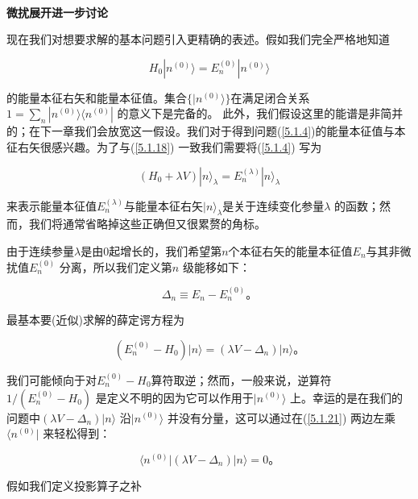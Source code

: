 ﻿\documentclass[UTF8,twoside]{ctexart}
\begin{document}
\

\noindent \textbf{微扰展开进一步讨论}

现在我们对想要求解的基本问题引入更精确的表述。假如我们完全严格地知道

\begin{equation} \label{5.1.18}
H_0|n^{(0)}\rangle = E_n^{(0)}|n^{(0)}\rangle
\end{equation}

\noindent 的能量本征右矢和能量本征值。集合$\{|n^{(0)}\rangle\}$在满足闭合关系$1=\sum_n|n^{(0)}\rangle\langle n^{(0)}|$ 的意义下是完备的。 此外，我们假设这里的能谱是非简并的；在下一章我们会放宽这一假设。我们对于得到问题(\ref{5.1.4})的能量本征值与本征右矢很感兴趣。为了与(\ref{5.1.18}) 一致我们需要将(\ref{5.1.4}) 写为

\begin{equation} \label{5.1.19}
(H_0 + \lambda V)|n\rangle_\lambda = E_n^{(\lambda)}|n\rangle_\lambda
\end{equation}

\noindent 来表示能量本征值$E_n^{(\lambda)}$与能量本征右矢$|n\rangle_\lambda$是关于连续变化参量$\lambda$ 的函数；然而，我们将通常省略掉这些正确但又很累赘的角标。

由于连续参量$\lambda$是由0起增长的，我们希望第$n$个本征右矢的能量本征值$E_n$与其非微扰值$E_n^{(0)}$ 分离，所以我们定义第$n$ 级能移如下：

\begin{equation} \label{5.1.20}
\Delta_n\equiv E_n - E_n^{(0)}\text{。}
\end{equation}

\noindent 最基本要(近似)求解的薛定谔方程为

\begin{equation} \label{5.1.21}
(E_n^{(0)} - H_0)|n\rangle = (\lambda V - \Delta_n)|n\rangle\text{。}
\end{equation}

\noindent 我们可能倾向于对$E_n^{(0)} - H_0$算符取逆；然而，一般来说，逆算符$1/(E_n^{(0)} - H_0)$ 是定义不明的因为它可以作用于$|n^{(0)}\rangle$ 上。幸运的是在我们的问题中$(\lambda V - \Delta_n)|n\rangle$ 沿$|n^{(0)}\rangle$ 并没有分量，这可以通过在(\ref{5.1.21}) 两边左乘$\langle n^{(0)}|$ 来轻松得到：

\begin{equation} \label{5.1.22}
\langle n^{(0)}|(\lambda V - \Delta_n)|n \rangle = 0\text{。}
\end{equation}

\noindent 假如我们定义投影算子之补
\end{document}
